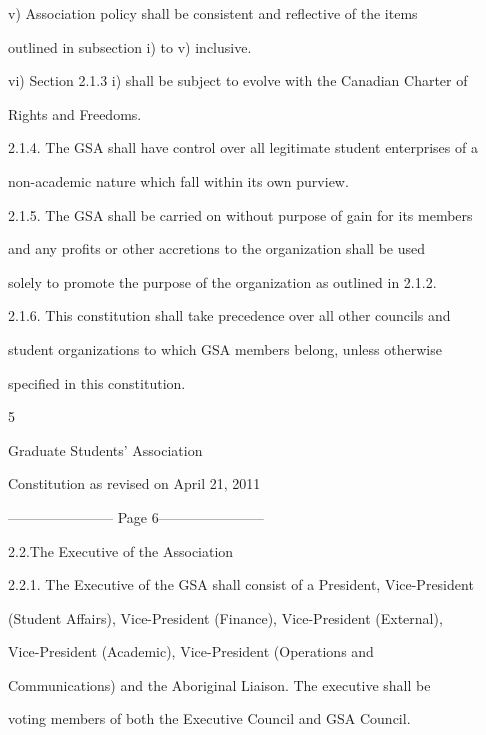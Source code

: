 \documentclass{article}
\begin{document}
v)      Association  policy  shall  be  consistent  and  reflective  of  the  items  

outlined in subsection i) to v) inclusive.  



vi)      Section 2.1.3 i) shall be subject to evolve with the Canadian Charter of  

Rights and Freedoms.  



2.1.4. The GSA shall have control over all legitimate student enterprises of a  

non-academic nature which fall within its own purview.  



2.1.5. The GSA shall be carried on without purpose of gain for its members  

and  any  profits  or  other  accretions  to  the  organization  shall  be  used  

solely to promote the purpose of the organization as outlined in 2.1.2.  



2.1.6. This  constitution  shall  take  precedence  over  all  other  councils  and  

student organizations to which GSA members belong, unless otherwise  

specified in this constitution.  



  

5  



Graduate Students’ Association  



   Constitution as revised on April 21, 2011  


----------------------- Page 6-----------------------

  



2.2.The Executive of the Association  



2.2.1. The Executive of the GSA shall consist of a President, Vice-President  

(Student Affairs), Vice-President (Finance), Vice-President (External),  

Vice-President  (Academic), Vice-President (Operations and  

Communications) and the Aboriginal Liaison. The executive shall be  

voting  members  of  both  the  Executive  Council  and  GSA  Council.  
\end{document}
